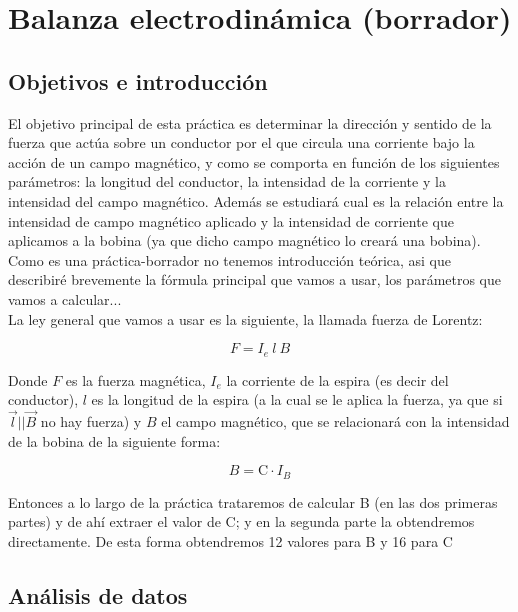 \documentclass[12pt,a4paper]{book}
\begin{document}



\chapter{Balanza electrodinámica (borrador)} \newpage
\section{Objetivos e introducción}
El objetivo principal de esta práctica es determinar la dirección y sentido de la fuerza que actúa sobre un conductor por el que circula una corriente bajo la acción de un campo magnético, y como se comporta en función de los siguientes parámetros: la longitud del conductor, la intensidad de la corriente y la intensidad del campo magnético. Además se estudiará cual es la relación entre la intensidad de campo magnético aplicado y la intensidad de corriente que aplicamos a la bobina (ya que dicho campo magnético lo creará una bobina). \\

Como es una práctica-borrador no tenemos introducción teórica, asi que describiré brevemente la fórmula principal que vamos a usar, los parámetros que vamos a calcular... \\

La ley general que vamos a usar es la siguiente, la llamada fuerza de Lorentz:

\begin{equation}
F = I_e \ l \ B
\label{Ec:balanza Fuerza de lorentz}
\end{equation}

Donde $F$ es la fuerza magnética, $I_e$ la corriente de la espira (es decir del conductor), $l$ es la longitud de la espira (a la cual se le aplica la fuerza, ya que si $\vec{l} || \vec{B}$ no hay fuerza) y $B$ el campo magnético, que se relacionará con la intensidad de la bobina de la siguiente forma:

\begin{equation}
B=\mathrm{C} \cdot I_B
\label{Ec:balanza Valor del campo magnético}
\end{equation}

Entonces a lo largo de la práctica trataremos de calcular B (en las dos primeras partes) y de ahí extraer el valor de C; y en la segunda parte la obtendremos directamente. De esta forma obtendremos 12 valores para B y 16 para C
\section{Análisis de datos}
\end{document}
